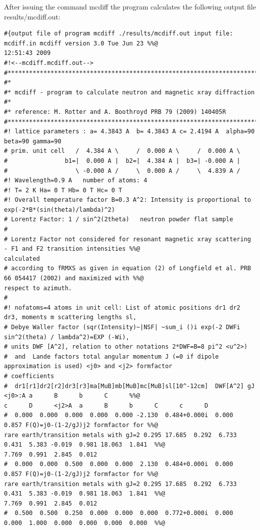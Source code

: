 After issuing the command {\prg mcdiff} 
the program calculates the following output file {\prg results/mcdiff.out}:

{\footnotesize
\begin{verbatim}
#{output file of program mcdiff ./results/mcdiff.out input file: mcdiff.in mcdiff version 3.0 Tue Jun 23 %%@
12:51:43 2009
#!<--mcdiff.mcdiff.out-->
#***********************************************************************
#*
#* mcdiff - program to calculate neutron and magnetic xray diffraction
#*
#* reference: M. Rotter and A. Boothroyd PRB 79 (2009) 140405R
#***********************************************************************
#! lattice parameters : a= 4.3843 A  b= 4.3843 A c= 2.4194 A  alpha=90  beta=90 gamma=90
# prim. unit cell   /  4.384 A \     /  0.000 A \     /  0.000 A \ 
#                b1=|  0.000 A |  b2=|  4.384 A |  b3=| -0.000 A |
#                   \ -0.000 A /     \  0.000 A /     \  4.839 A /
#! Wavelength=0.9 A   number of atoms: 4
#! T= 2 K Ha= 0 T Hb= 0 T Hc= 0 T
#! Overall temperature factor B=0.3 A^2: Intensity is proportional to exp(-2*B*(sin(theta)/lambda)^2)
# Lorentz Factor: 1 / sin^2(2theta)   neutron powder flat sample
#
# Lorentz Factor not considered for resonant magnetic xray scattering - F1 and F2 transition intensities %%@
calculated
# according to fRMXS as given in equation (2) of Longfield et al. PRB 66 054417 (2002) and maximized with %%@
respect to azimuth.
#
#! nofatoms=4 atoms in unit cell: List of atomic positions dr1 dr2 dr3, moments m scattering lengths sl,
# Debye Waller factor (sqr(Intensity)~|NSF| ~sum_i ()i exp(-2 DWFi sin^2(theta) / lambda^2)=EXP (-Wi),
# units DWF [A^2], relation to other notations 2*DWF=B=8 pi^2 <u^2>)
#  and  Lande factors total angular momentum J (=0 if dipole approximation is used) <j0> and <j2> formfactor
# coefficients
#  dr1[r1]dr2[r2]dr3[r3]ma[MuB]mb[MuB]mc[MuB]sl[10^-12cm]  DWF[A^2] gJ     <j0>:A a      B      b      C      %%@
c      D      <j2>A  a      B      b      C      c      D
#  0.000  0.000  0.000  0.000  0.000 -2.130  0.484+0.000i  0.000  0.857 F(Q)=j0-(1-2/gJ)j2 formfactor for %%@
rare earth/transition metals with gJ=2 0.295 17.685  0.292  6.733  0.431  5.383 -0.019  0.981 18.063  1.841  %%@
7.769  0.991  2.845  0.012 
#  0.000  0.000  0.500  0.000  0.000  2.130  0.484+0.000i  0.000  0.857 F(Q)=j0-(1-2/gJ)j2 formfactor for %%@
rare earth/transition metals with gJ=2 0.295 17.685  0.292  6.733  0.431  5.383 -0.019  0.981 18.063  1.841  %%@
7.769  0.991  2.845  0.012 
#  0.500  0.500  0.250  0.000  0.000  0.000  0.772+0.000i  0.000  0.000  1.000  0.000  0.000  0.000  0.000  %%@

\end{verbatim}}
